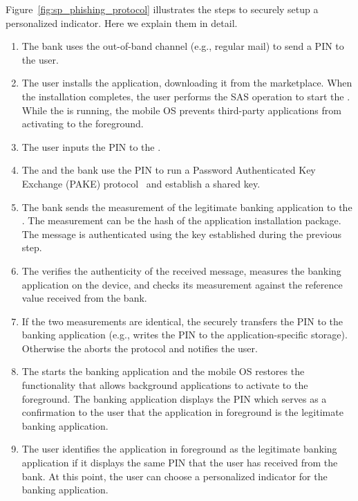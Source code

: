 Figure~\ref{fig:sp_phishing_protocol} illustrates the steps to securely setup a personalized indicator. Here we explain them in detail.

\begin{enumerate}
\item The bank uses the out-of-band channel (e.g., regular mail) to send a PIN to the user.

\item The user installs the application, downloading it from the marketplace.
    When the installation completes, the user performs the SAS operation to start the \secmodule{}.
    While the \secmodule{} is running, the mobile OS prevents third-party applications from activating to the foreground.

\item   The user inputs the PIN to the \secmodule{}.

\item   The \secmodule{} and the bank use the PIN to run a Password Authenticated Key Exchange (PAKE)
        protocol~\cite{speke} and establish a shared key.

\item   The bank sends the measurement of the legitimate banking application to the \secmodule{}.
        The measurement can be the hash of the application installation package.
        The message is authenticated using the key established during the previous step.
	
\item   The \secmodule{} verifies the authenticity of the received message, measures the banking application on the device,
        and checks its measurement against the reference value received from the bank.

\item   If the two measurements are identical, the \secmodule{} securely transfers the PIN to the banking application
        (e.g., writes the PIN to the application-specific storage).
        Otherwise the \secmodule{} aborts the protocol and notifies the user.

\item   The \secmodule{} starts the banking application and the mobile OS restores the functionality that allows background applications to
        activate to the foreground. The banking application displays the PIN which serves
        as a confirmation to the user that the application in foreground is the legitimate banking application.

\item   The user identifies the application in foreground as the legitimate banking application if it displays the same PIN that the user has received from the bank.
        At this point, the user can choose a personalized indicator for the banking application.
\end{enumerate}

